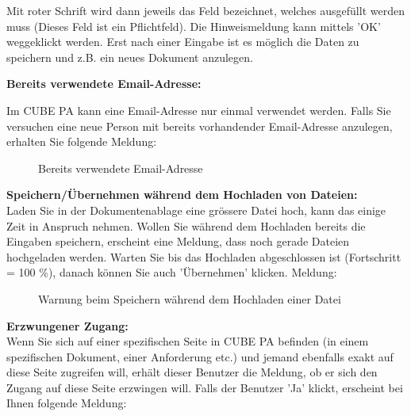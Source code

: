 Mit roter Schrift wird dann jeweils das Feld bezeichnet, welches ausgefüllt werden muss (Dieses Feld ist ein Pflichtfeld). Die Hinweismeldung kann mittels 'OK' weggeklickt werden. Erst nach einer Eingabe ist es möglich die Daten zu speichern und z.B. ein neues Dokument anzulegen. 

\pagebreak
\textbf{Bereits verwendete Email-Adresse:}

Im CUBE PA kann eine Email-Adresse nur einmal verwendet werden. Falls Sie versuchen eine neue Person mit bereits vorhandender Email-Adresse anzulegen, erhalten Sie folgende Meldung:

\begin{figure}[H]
\caption{Bereits verwendete Email-Adresse}
\end{figure}

\vspace{\baselineskip}

\textbf{Speichern/Übernehmen während dem Hochladen von Dateien:}\\
Laden Sie in der Dokumentenablage eine grössere Datei hoch, kann das einige Zeit in Anspruch nehmen. Wollen Sie während dem Hochladen bereits die Eingaben speichern, erscheint eine Meldung, dass noch gerade Dateien hochgeladen werden. Warten Sie bis das Hochladen abgeschlossen ist (Fortschritt = 100 \%), danach können Sie auch 'Übernehmen' klicken. Meldung:

\begin{figure}[H]
\caption{Warnung beim Speichern während dem Hochladen einer Datei}
\end{figure}

\textbf{Erzwungener Zugang:}\\
Wenn Sie sich auf einer spezifischen Seite in CUBE PA befinden (in einem spezifischen Dokument, einer Anforderung etc.) und jemand ebenfalls exakt auf diese Seite zugreifen will, erhält dieser Benutzer die Meldung, ob er sich den Zugang auf diese Seite erzwingen will. Falls der Benutzer 'Ja' klickt, erscheint bei Ihnen folgende Meldung: 

